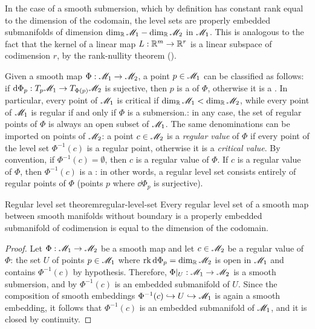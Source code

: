 In the case of a smooth submersion, which by definition has constant rank equal to the dimension of the codomain, the level sets are properly embedded submanifolds of dimension $ \dim_{\mathbb{R}} \mathscr{M}_1 - \dim_{\mathbb{R}} \mathscr{M}_2 $ in $ \mathscr{M}_1 $. This is analogous to the fact that the kernel of a linear map $ L : \mathbb{R}^m \rightarrow \mathbb{R}^r $ is a linear subspace of codimension $ r $, by the rank-nullity theorem ().

Given a smooth map $ \Phi : \mathscr{M}_1 \rightarrow \mathscr{M}_2 $, a point $ p \in \mathscr{M}_1 $ can be classified as follows: if $ \mathrm{d} \Phi_p : T_p\mathscr{M}_1 \rightarrow T_{\Phi(p)}\mathscr{M}_2 $ is sujective, then $ p $ is a  of $ \Phi $, otherwise it is a . In particular, every point of $ \mathscr{M}_1 $ is critical if $ \dim_{\mathbb{R}} \mathscr{M}_1 < \dim_{\mathbb{R}} \mathscr{M}_2 $, while every point of $ \mathscr{M}_1 $ is regular if and only if $ \Phi $ is a submersion.: in any case, the set of regular points of $ \Phi $ is always an open subset of $ \mathscr{M}_1 $. The same denominations can be imported on points of $ \mathscr{M}_2 $: a point $ c \in \mathscr{M}_2 $ is a \emph{regular value} of $ \Phi $ if every point of the level set $ \Phi^{-1}(c) $ is a regular point, otherwise it is a \emph{critical value}. By convention, if $ \Phi^{-1}(c) = \emptyset $, then $ c $ is a regular value of $ \Phi $. If $ c $ is a regular value of $ \Phi $, then $ \Phi^{-1}(c) $ is a : in other words, a regular level set consists entirely of regular points of $ \Phi $ (points $ p $ where $ \dd \Phi_p $ is surjective).

\begin{theorem}{Regular level set theorem}{regular-level-set}
  Every regular level set of a smooth map between smooth manifolds without boundary is a properly embedded submanifold of codimension is equal to the dimension of the codomain.
\end{theorem}

\begin{proofbox}
  \begin{proof}
    Let $ \Phi : \mathscr{M}_1 \rightarrow \mathscr{M}_2 $ be a smooth map and let $ c \in \mathscr{M}_2 $ be a regular value of $ \Phi $: the set $ U $ of points $ p \in \mathscr{M}_1 $ where $ \operatorname{rk} \mathrm{d} \Phi_p = \dim_{\mathbb{R}} \mathscr{M}_2 $ is open in $ \mathscr{M}_1 $ and contains $ \Phi^{-1}(c) $ by hypothesis. Therefore, $ \Phi \vert_U : \mathscr{M}_1 \rightarrow \mathscr{M}_2 $ is a smooth submersion, and by  $ \Phi^{-1}(c) $ is an embedded submanifold of $ U $. Since the composition of smooth embeddings $ \Phi^{-1}(c) \hookrightarrow U \hookrightarrow \mathscr{M}_1 $ is again a smooth embedding, it follows that $ \Phi^{-1}(c) $ is an embedded submanifold of $ \mathscr{M}_1 $, and it is closed by continuity.
  \end{proof}
\end{proofbox}


